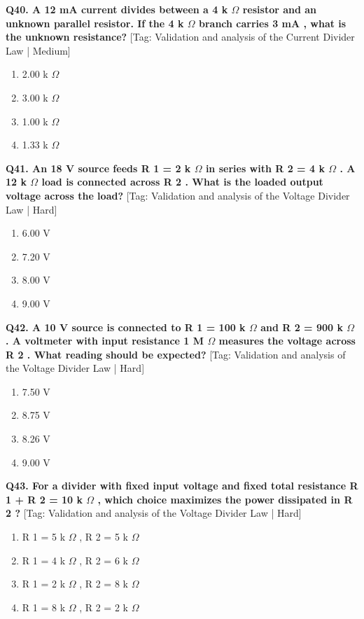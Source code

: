 \noindent\textbf{Q40. A 12 mA current divides between a 4 k $\Omega$ resistor and an unknown parallel resistor. If the 4 k $\Omega$ branch carries 3 mA , what is the unknown resistance?} \hfill [Tag: Validation and analysis of the Current Divider Law | Medium]
\begin{enumerate}[label=(\alph*),topsep=2pt,itemsep=1pt,partopsep=0pt,parsep=0pt]
    \item {2.00 k $\Omega$}
    \item {3.00 k $\Omega$}
    \item {1.00 k $\Omega$}
    \item {1.33 k $\Omega$}
\end{enumerate}
\vspace{2mm}

\noindent\textbf{Q41. An 18 V source feeds R 1 = 2 k $\Omega$ in series with R 2 = 4 k $\Omega$ . A 12 k $\Omega$ load is connected across R 2 . What is the loaded output voltage across the load?} \hfill [Tag: Validation and analysis of the Voltage Divider Law | Hard]
\begin{enumerate}[label=(\alph*),topsep=2pt,itemsep=1pt,partopsep=0pt,parsep=0pt]
    \item {6.00 V}
    \item {7.20 V}
    \item {8.00 V}
    \item {9.00 V}
\end{enumerate}
\vspace{2mm}

\noindent\textbf{Q42. A 10 V source is connected to R 1 = 100 k $\Omega$ and R 2 = 900 k $\Omega$ . A voltmeter with input resistance 1 M $\Omega$ measures the voltage across R 2 . What reading should be expected?} \hfill [Tag: Validation and analysis of the Voltage Divider Law | Hard]
\begin{enumerate}[label=(\alph*),topsep=2pt,itemsep=1pt,partopsep=0pt,parsep=0pt]
    \item {7.50 V}
    \item {8.75 V}
    \item {8.26 V}
    \item {9.00 V}
\end{enumerate}
\vspace{2mm}

\noindent\textbf{Q43. For a divider with fixed input voltage and fixed total resistance R 1 + R 2 = 10 k $\Omega$ , which choice maximizes the power dissipated in R 2 ?} \hfill [Tag: Validation and analysis of the Voltage Divider Law | Hard]
\begin{enumerate}[label=(\alph*),topsep=2pt,itemsep=1pt,partopsep=0pt,parsep=0pt]
    \item {R 1 = 5 k $\Omega$ , R 2 = 5 k $\Omega$}
    \item {R 1 = 4 k $\Omega$ , R 2 = 6 k $\Omega$}
    \item {R 1 = 2 k $\Omega$ , R 2 = 8 k $\Omega$}
    \item {R 1 = 8 k $\Omega$ , R 2 = 2 k $\Omega$}
\end{enumerate}
\vspace{2mm}

